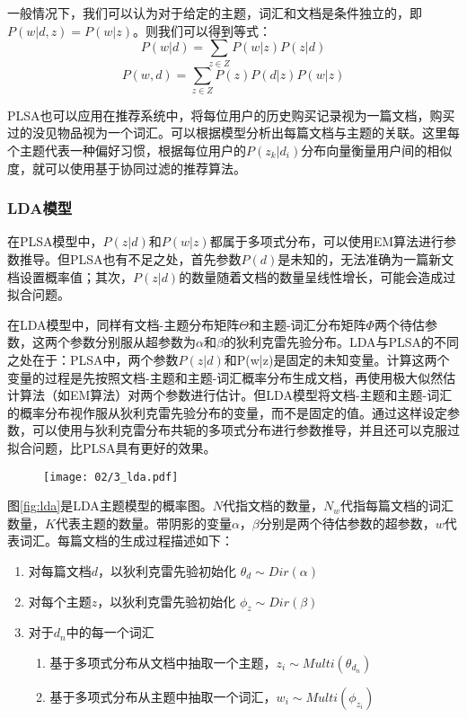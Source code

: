 一般情况下，我们可以认为对于给定的主题，词汇和文档是条件独立的，即$P(w|d,z) = P(w|z)$。则我们可以得到等式：
\begin{equation}
	P(w|d) = \sum_{z\in Z}P(w|z)P(z|d)
\end{equation}
\begin{equation}
	P(w,d) = \sum_{z\in Z}P(z)P(d|z)P(w|z)
\end{equation}

PLSA也可以应用在推荐系统中，将每位用户的历史购买记录视为一篇文档，购买过的没见物品视为一个词汇。可以根据模型分析出每篇文档与主题的关联。这里每个主题代表一种偏好习惯，根据每位用户的$P(z_k|d_i)$分布向量衡量用户间的相似度，就可以使用基于协同过滤的推荐算法。

\subsubsection{LDA模型}


在PLSA模型中，$P(z|d)$和$P(w|z)$都属于多项式分布，可以使用EM算法进行参数推导。但PLSA也有不足之处，首先参数$P(d)$是未知的，无法准确为一篇新文档设置概率值；其次，$P(z|d)$的数量随着文档的数量呈线性增长，可能会造成过拟合问题。

在LDA模型中，同样有文档-主题分布矩阵$\Theta$和主题-词汇分布矩阵$\Phi$两个待估参数，这两个参数分别服从超参数为$\alpha$和$\beta$的狄利克雷先验分布。LDA与PLSA的不同之处在于：PLSA中，两个参数$P(z|d)$和P(w|z)是固定的未知变量。计算这两个变量的过程是先按照文档-主题和主题-词汇概率分布生成文档，再使用极大似然估计算法（如EM算法）对两个参数进行估计。但LDA模型将文档-主题和主题-词汇的概率分布视作服从狄利克雷先验分布的变量，而不是固定的值。通过这样设定参数，可以使用与狄利克雷分布共轭的多项式分布进行参数推导，并且还可以克服过拟合问题，比PLSA具有更好的效果。

\begin{figure}
 \centering
 \texttt{[image: 02/3\_lda.pdf]}
\end{figure}

图\ref{fig:lda}是LDA主题模型的概率图。$N$代指文档的数量，$N_w$代指每篇文档的词汇数量，$K$代表主题的数量。带阴影的变量$\alpha$，$\beta$分别是两个待估参数的超参数，$w$代表词汇。每篇文档的生成过程描述如下：

\begin{enumerate}
\item 对每篇文档$d$，以狄利克雷先验初始化 $\theta_d \sim Dir(\alpha)$
\item 对每个主题$z$，以狄利克雷先验初始化 $\phi_z \sim Dir(\beta)$
\item 对于$d_n$中的每一个词汇
       \begin{enumerate}[fullwidth,itemindent=1em,label=(\alph*)]
       \item 基于多项式分布从文档中抽取一个主题，$z_i \sim Multi(\theta_{d_n})$
       \item 基于多项式分布从主题中抽取一个词汇，$w_i \sim Multi(\phi_{z_i})$
       \end{enumerate}
\end{enumerate}

